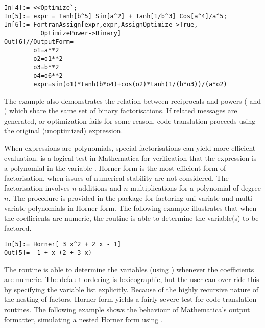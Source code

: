 \documentclass [12pt,twoside]{article}
\begin{document}
\begin{verbatim}
In[4]:= <<Optimize`;
In[5]:= expr = Tanh[b^5] Sin[a^2] + Tanh[1/b^3] Cos[a^4]/a^5;
In[6]:= FortranAssign[expr,expr,AssignOptimize->True,
          OptimizePower->Binary]
Out[6]//OutputForm=
        o1=a**2
        o2=o1**2
        o3=b**2
        o4=o6**2
        expr=sin(o1)*tanh(b*o4)+cos(o2)*tanh(1/(b*o3))/(a*o2)
\end{verbatim}
The example also demonstrates the relation between reciprocals and powers
( and ) which share the same set of binary
factorisations. If  related messages are generated, or optimization
fails for some reason, code translation proceeds using the original (unoptimized)
expression.

When expressions are polynomials, special factorisations can yield more efficient
evaluation.  is a logical test in Mathematica for
verification that the expression  is a polynomial in the variable
. Horner form is the most efficient form of factorisation, when issues
of numerical stability are not considered. The factorisation involves
$n$ additions and $n$ multiplications for a polynomial of degree $n$. The
procedure  is provided in the package  for factoring
uni-variate and multi-variate polynomials in Horner form. The following example
illustrates that when the coefficients are numeric, the routine is able to
determine the variable(s) to be factored.
\begin{verbatim}
In[5]:= Horner[ 3 x^2 + 2 x - 1]
Out[5]= -1 + x (2 + 3 x)
\end{verbatim}
The routine is able to determine the variables (using )
whenever the coefficients are numeric. The default ordering is lexicographic, but
the user can over-ride this by specifying the variable list explicitly. Because
of the highly recursive nature of the nesting of factors, Horner form yields a
fairly severe test for code translation routines. The following example shows the
behaviour of Mathematica's output formatter, simulating a nested Horner form
using .
\end{document}
